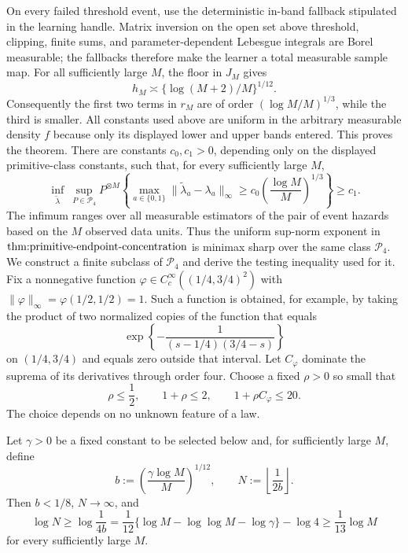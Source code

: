 On every failed threshold event, use the deterministic in-band fallback stipulated in the learning handle. Matrix inversion on the open set above threshold, clipping, finite sums, and parameter-dependent Lebesgue integrals are Borel measurable; the fallbacks therefore make the learner a total measurable sample map. For all sufficiently large \(M\), the floor in \(J_M\) gives
\[
h_M\asymp\{\log(M+2)/M\}^{1/12}.
\]
Consequently the first two terms in \(r_M\) are of order \((\log M/M)^{1/3}\), while the third is smaller. All constants used above are uniform in the arbitrary measurable density \(f\) because only its displayed lower and upper bands entered. This proves the theorem.
There are constants \(c_0,c_1>0\), depending only on the displayed primitive-class constants, such that, for every sufficiently large \(M\),
\[
\inf_{\widetilde\lambda}\ \sup_{P\in\mathcal P_4}
P^{\otimes M}\!\left\{
\max_{a\in\{0,1\}}\lVert\widetilde\lambda_a-\lambda_a\rVert_\infty
\ge c_0\left(\frac{\log M}{M}\right)^{1/3}
\right\}\ge c_1.
\]
The infimum ranges over all measurable estimators of the pair of event hazards based on the \(M\) observed data units. Thus the uniform sup-norm exponent in \(\textnormal{thm:primitive-endpoint-concentration}\) is minimax sharp over the same class \(\mathcal P_4\).
We construct a finite subclass of \(\mathcal P_4\) and derive the testing inequality used for it. Fix a nonnegative function \(\varphi\in C_c^\infty((1/4,3/4)^2)\) with \(\lVert\varphi\rVert_\infty=\varphi(1/2,1/2)=1\). Such a function is obtained, for example, by taking the product of two normalized copies of the function that equals
\[
\exp\!\left\{-\frac{1}{(s-1/4)(3/4-s)}\right\}
\]
on \((1/4,3/4)\) and equals zero outside that interval. Let \(C_\varphi\) dominate the suprema of its derivatives through order four. Choose a fixed \(\rho>0\) so small that
\[
\rho\le\frac12,
\qquad
1+\rho\le2,
\qquad
1+\rho C_\varphi\le20. \tag{12}
\]
The choice depends on no unknown feature of a law.

Let \(\gamma>0\) be a fixed constant to be selected below and, for sufficiently large \(M\), define
\[
b:=\left(\frac{\gamma\log M}{M}\right)^{1/12},
\qquad
N:=\left\lfloor\frac{1}{2b}\right\rfloor.
\tag{13}
\]
Then \(b<1/8\), \(N\to\infty\), and
\[
\log N\ge\log\frac{1}{4b}
=\frac1{12}\{\log M-\log\log M-\log\gamma\}-\log4
\ge\frac1{13}\log M \tag{14}
\]
for every sufficiently large \(M\).

